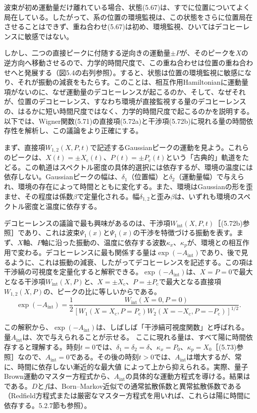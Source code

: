 \hypertarget{srcpage:198}{}\label{srcpage:198}
波束が初め運動量だけ離れている場合、状態(5.67)は、すでに位置についてよく局在している。したがって、系の位置の環境監視は、この状態をさらに位置局在させることはできず、重ね合わせ(5.67)は初め、環境監視、ひいてはデコヒーレンスに敏感ではない。

しかし、二つの直接ピークに付随する逆向きの運動量$\pm P$が、そのピークを$X$の逆方向へ移動させるので、力学的時間尺度で、この重ね合わせは位置の重ね合わせへと発展する（図5.4の右列参照）。すると、状態は位置の環境監視に敏感になり、それが振動の減衰をもたらす。このことは、相互作用Hamiltonianに運動量項がないのに、なぜ運動量のデコヒーレンスが起こるのか、そして、なぜそれが、位置のデコヒーレンス、すなわち環境が直接監視する量のデコヒーレンスの、はるかに短い時間尺度ではなく、力学的時間尺度で起こるのかを説明する。以下では、Wigner関数(5.71)の直接項(5.72a)と干渉項(5.72b)に現れる量の時間依存性を解析し、この議論をより正確にする。

まず、直接項$W_{1,2}(X,P,t)$で記述するGaussianピークの運動を見よう。これらのピークは、$X(t)=\pm X_{\mathrm c}(t)$、$P(t)=\pm P_{\mathrm c}(t)$という「古典的」軌道をたどる。この軌道はスペクトル密度の具体的選択には依存するが、環境の温度には依存しない。Gaussianピークの幅は、$\delta_1$（位置幅）と$\delta_2$（運動量幅）で与えられ、環境の存在によって時間とともに変化する。また、環境はGaussianの形を歪ませ、その程度は係数$\beta$で定量化される。幅$\delta_{1,2}$と歪み$\beta$は、いずれも環境のスペクトル密度と温度に依存する。

デコヒーレンスの議論で最も興味があるのは、干渉項$W_{\mathrm{int}}(X,P,t)$［(5.72b)参照］であり、これは波束$\Psi_1(x)$と$\Psi_1(x)$の干渉を特徴づける振動を表す。まず、$X$軸、$P$軸に沿った振動の、温度に依存する波数$\kappa_x$、$\kappa_p$が、環境との相互作用で変わる。デコヒーレンスに最も関係する量は$\exp(-A_{\mathrm{int}})$であり、後で見るように、これは振動の減衰、したがってデコヒーレンスを記述する。この項は干渉縞の可視度を定量化すると解釈できる。$\exp(-A_{\mathrm{int}})$は、$X=P=0$で最大となる干渉項$W_{\mathrm{int}}(X,P)$と、$X=\pm X_{\mathrm c}$、$P=\pm P_{\mathrm c}$で最大となる直接項$W_{1,2}(X,P)$の、ピークの比に等しいからである。
\begin{equation}
\exp(-A_{\mathrm{int}})=\frac12\frac{W_{\mathrm{int}}(X=0,P=0)}{[W_1(X=X_{\mathrm c},P=P_{\mathrm c})W_2(X=-X_{\mathrm c},P=-P_{\mathrm c})]^{1/2}}.
\tag{5.74}
\end{equation}

\hypertarget{srcpage:199}{}\label{srcpage:199}
この解釈から、$\exp(-A_{\mathrm{int}})$は、しばしば「干渉縞可視度関数」と呼ばれる。量$A_{\mathrm{int}}$は、次で与えられることが示せる\cite{ref184}。
ここに現れる量は、すべて陽に時間依存すると理解する。時刻$t=0$では、$\delta_1=\delta_2=\delta$、$\kappa_x=P_0$、$\kappa_p=X_0$［(5.73)参照］なので、$A_{\mathrm{int}}=0$である。その後の時刻$t>0$では、$A_{\mathrm{int}}$は増大するが、常に、時間に依存しない漸近的な最大値
によって上から抑えられる。実際、量子Brown運動のマスター方程式から、$A_{\mathrm{int}}$の具体的な運動方程式を導ける。結果は\cite{ref184}
である。$D$と$f$は、Born--Markov近似での通常拡散係数と異常拡散係数である（Redfield方程式または厳密なマスター方程式\cite{ref219}を用いれば、これらは陽に時間に依存する。5.2.7節も参照）。

